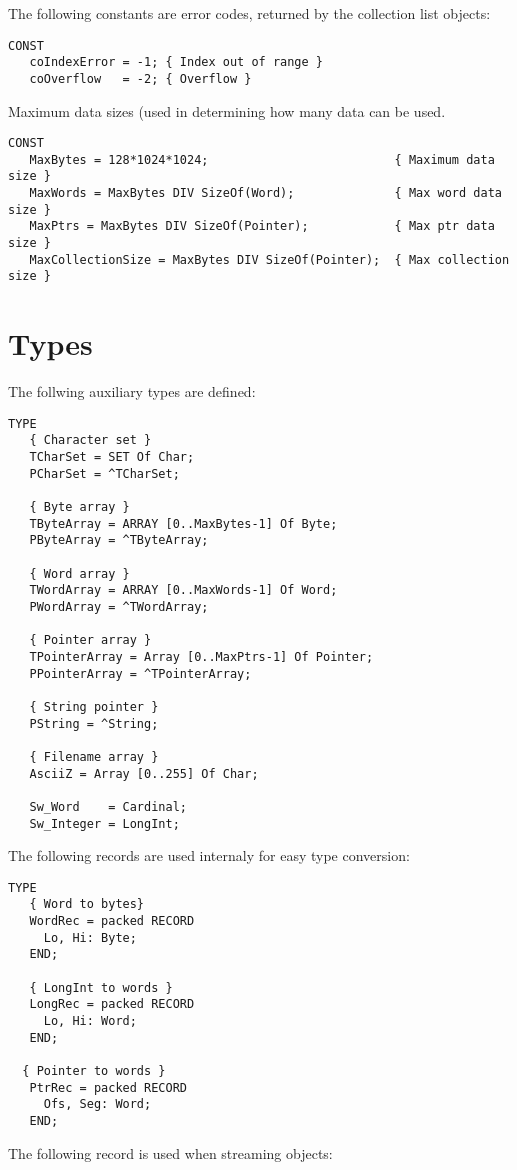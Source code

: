 The following constants are error codes, returned by the collection list
objects:
\begin{verbatim}
CONST
   coIndexError = -1; { Index out of range }
   coOverflow   = -2; { Overflow }
\end{verbatim}

Maximum data sizes (used in determining how many data can be used.

\begin{verbatim}
CONST
   MaxBytes = 128*1024*1024;                          { Maximum data size }
   MaxWords = MaxBytes DIV SizeOf(Word);              { Max word data size }
   MaxPtrs = MaxBytes DIV SizeOf(Pointer);            { Max ptr data size }
   MaxCollectionSize = MaxBytes DIV SizeOf(Pointer);  { Max collection size }
\end{verbatim}

\section{Types}
The follwing auxiliary types are defined:
\begin{verbatim}
TYPE
   { Character set }
   TCharSet = SET Of Char;                            
   PCharSet = ^TCharSet;

   { Byte array }
   TByteArray = ARRAY [0..MaxBytes-1] Of Byte;        
   PByteArray = ^TByteArray;

   { Word array }
   TWordArray = ARRAY [0..MaxWords-1] Of Word;        
   PWordArray = ^TWordArray;

   { Pointer array }
   TPointerArray = Array [0..MaxPtrs-1] Of Pointer;   
   PPointerArray = ^TPointerArray; 

   { String pointer }
   PString = ^String;

   { Filename array }
   AsciiZ = Array [0..255] Of Char;

   Sw_Word    = Cardinal;
   Sw_Integer = LongInt;
\end{verbatim}
The following records are used internaly for easy type conversion:
\begin{verbatim}
TYPE
   { Word to bytes}
   WordRec = packed RECORD
     Lo, Hi: Byte;     
   END;

   { LongInt to words }
   LongRec = packed RECORD
     Lo, Hi: Word;
   END;

  { Pointer to words }
   PtrRec = packed RECORD
     Ofs, Seg: Word;
   END;
\end{verbatim}

The following record is used when streaming objects:

